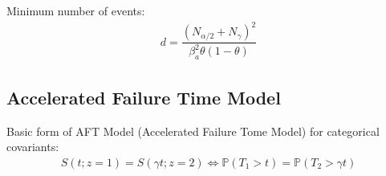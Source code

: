     Minimum number of events:
    \begin{align}
        d=\dfrac{(N_{\alpha /2}+N_\gamma )^2}{\beta _a^2\theta (1-\theta )} 
    \end{align}
    
    
    
    
    
    

    

\subsection{Accelerated Failure Time Model}

    Basic form of AFT Model (Accelerated Failure Tome Model) for categorical covariants:
    \begin{align}
        S(t;z=1)=S(\gamma t;z=2)\Leftrightarrow \mathbb{P}\left( T_1>t \right) =\mathbb{P}\left( T_2>\gamma t \right)  
    \end{align}

